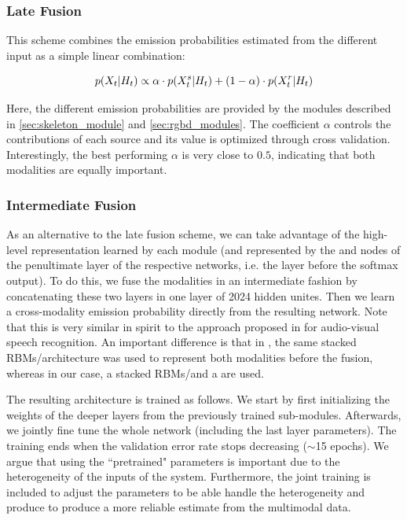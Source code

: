 \subsubsection{Late Fusion}
%
This scheme combines the emission probabilities estimated from the different input as a simple linear combination:

\begin{equation}
p(X_t | H_t)  \propto  \alpha \cdot  p(X_t^s | H_t) + (1-\alpha)\cdot p(X_t^r | H_t)
\end{equation}

Here, the different emission probabilities are provided by the modules described in \ref{sec:skeleton_module} and \ref{sec:rgbd_modules}.
The coefficient $\alpha$ controls the contributions of each source  and its value is optimized through cross validation.
Interestingly, the best performing $\alpha$ is very close to $0.5$, indicating that both modalities are equally important.


\subsubsection{Intermediate Fusion}
\label{early_fusion}

As an alternative to the late fusion scheme, we can take advantage of the high-level representation  learned by each module
(and represented by the \highSK and \highRGBD nodes of the penultimate layer of the respective networks, i.e. the layer before the softmax output).
To do this, we fuse the modalities in an intermediate fashion by concatenating these two layers in one layer of 2024 hidden unites. Then we learn a cross-modality emission probability directly from the resulting network.
%
Note that this is very similar in spirit to the approach proposed in \cite{Ngiam2011multimodal}
for audio-visual speech recognition.
%
An important difference is that in \cite{Ngiam2011multimodal}, the same stacked RBMs/\DBN architecture was used
to represent both modalities before the fusion, whereas in our case, a stacked RBMs/\DBN and a \ThreeDCNN are used.
%

The resulting architecture is trained as follows. We start by first initializing the weights of the deeper layers from the previously trained sub-modules.
Afterwards, we jointly fine tune the whole network (including the last layer parameters).
The training ends when the validation error rate stops decreasing ($\sim$15 epochs).
%
We argue that using the ``pretrained" parameters is important due to the heterogeneity of the inputs of the system. Furthermore, the joint training is included to adjust the  parameters to be able handle  the heterogeneity and produce to produce a more reliable estimate from the multimodal data.


